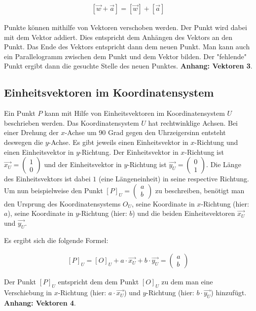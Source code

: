 \documentclass{article}
\newcommand{\m}[1]{\begin{pmatrix}#1\end{pmatrix}}
\begin{document}
    \[
        \begin{split}
            [\vec{w} + \vec{a}] = [\vec{w}] + [\vec{a}]
        \end{split}
    \]

    Punkte können mithilfe von Vektoren verschoben werden. Der Punkt wird dabei mit dem Vektor
    addiert. Dies entspricht dem Anhängen des Vektors an den Punkt. Das Ende des Vektors entspricht dann
    dem neuen Punkt. Man kann auch ein Parallelogramm zwischen dem Punkt und dem Vektor bilden. Der "fehlende"
    Punkt ergibt dann die gesuchte Stelle des neuen Punktes. \textbf{Anhang: Vektoren 3}.

    \subsection{Einheitsvektoren im Koordinatensystem}
    Ein Punkt $P$ kann mit Hilfe von Einheitsvektoren im Koordinatensystem $U$ beschrieben werden.
    Das Koordinatensystem $U$ hat rechtwinklige Achsen.
    Bei einer Drehung der $x$-Achse um 90 Grad gegen den Uhrzeigersinn entsteht deswegen die $y$-Achse.
    Es gibt jeweils einen Einheitsvektor in
    $x$-Richtung und einen Einheitsvektor in $y$-Richtung. Der Einheitsvektor in $x$-Richtung ist $\vec{{x}_{U}} = \m{1 \\ 0}$ und der Einheitsvektor in
    $y$-Richtung ist $\vec{{y}_{U}} = \m{0 \\ 1}$. Die Länge des Einheitsvektors ist dabei $1$
    (eine Längeneinheit)
    in seine respective Richtung. Um nun beispielweise den Punkt
    ${[P]}_{U} = \m{a \\ b}$ zu beschreiben, benötigt man den Ursprung des Koordinatensystems ${O}_{U}$, seine Koordinate in $x$-Richtung (hier: $a$),
    seine Koordinate in $y$-Richtung (hier: $b$) und die beiden Einheitsvektoren $\vec{{x}_{U}}$ und $\vec{{y}_{U}}$.
    
    Es ergibt sich die folgende Formel:

    \[
        \begin{split}
            {[P]}_{U} = {[O]}_{U} + a \cdot \vec{{x}_{U}} + b \cdot \vec{{y}_{U}} = \m{a \\ b}
        \end{split}
    \]

    Der Punkt ${[P]}_{U}$ entspricht dem dem Punkt ${[O]}_{U}$ zu dem man eine Verschiebung in
    $x$-Richtung (hier: $a \cdot \vec{{x}_{U}}$) und $y$-Richtung (hier: $b \cdot \vec{{y}_{U}}$) hinzufügt.
    \textbf{Anhang: Vektoren 4}.
\end{document}
